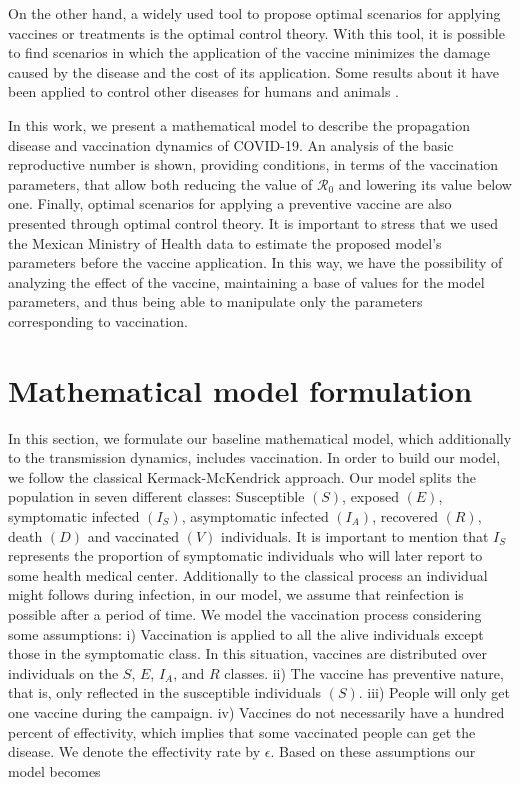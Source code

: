 \documentclass[preprint, sort&compress]{elsarticle}
\begin{document}
On the other hand, a widely used tool to propose optimal scenarios for applying vaccines or treatments is the optimal control theory. With this tool, it is possible to find scenarios in which the application of the vaccine minimizes the damage caused by the disease and the cost of its application. Some results about it have been applied to control other diseases for humans and animals \cite{Asano2008,Rodrigues2014,Tchuenche2011,Malik2016,Jaberi2014}.

In this work, we present a mathematical model to describe the propagation disease and vaccination dynamics of COVID-19. An analysis of the basic reproductive number is shown, providing conditions, in terms of the vaccination parameters, that allow both reducing the value of $\mathcal{R}_{0}$ and lowering its value below one. Finally, optimal scenarios for applying a preventive vaccine are also presented through optimal control theory. It is important to stress that we used the Mexican Ministry of Health data to estimate the proposed model's parameters before the vaccine application. In this way, we have the possibility of analyzing the effect of the vaccine, maintaining a base of values for the model parameters, and thus being able to manipulate only the parameters corresponding to vaccination. 
 	\section{Mathematical model formulation}\noindent In this section, we formulate our baseline mathematical model, which additionally to the transmission dynamics, includes vaccination. In order to build our model, we follow the classical Kermack-McKendrick approach. Our model splits the population in seven different classes: Susceptible $(S)$, exposed $(E)$, symptomatic infected $(I_S)$, asymptomatic infected $(I_A)$, recovered $(R)$, death $(D)$ and vaccinated $(V)$ individuals. It is important to mention that $I_{S}$ represents the proportion of symptomatic individuals who will later report to some health medical center. Additionally to the classical process an individual might follows during infection, in our model, we assume that reinfection is possible after a period of time. We model the vaccination process considering some assumptions: i) Vaccination is applied to all the alive individuals except those in the symptomatic class. In this situation, vaccines are distributed over individuals on the $S$, $E$, $I_A$, and $R$ classes. ii) The vaccine has preventive nature, that is, only reflected in the susceptible individuals $(S)$. iii) People will only get one vaccine during the campaign. iv) Vaccines do not necessarily have a hundred percent of effectivity, which implies that some vaccinated people can get the disease. We denote the effectivity rate by $\epsilon$. Based on these assumptions our model becomes
\end{document}
